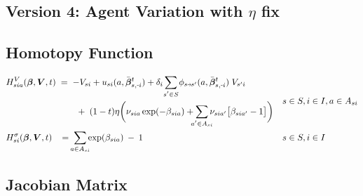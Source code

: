 \documentclass[11pt,fleqn]{article}
\newcommand{\bbeta}{\bm{\beta}}
\newcommand{\bV}{\bm{V}}
\newcommand{\shortminus}{{\text{\scalebox{0.4}[1.0]{\(-\)}}}}
\newcommand{\minusi}{\shortminus i}
\newcommand{\shortrightarrow}{\parbox{4pt}{\tikz{\draw[->](0,0)--(4pt,0);}}}
\newcommand{\phiss}{\phi_{s\shortrightarrow s'}}
\begin{document}
\subsection{Version 4: Agent Variation with $\eta$ fix}


\subsection*{Homotopy Function}

\begin{align*}
	& \begin{aligned}
		H^V_{sia}(\bbeta,\bV,t) & \;=\; - V_{si} + u_{si}(a,\bar{\bbeta}^t_{s,\minusi}) + \delta_i \sum\limits_{\mathclap{s'\in S}} \phiss(a,\bar{\bbeta}^t_{s,\minusi}) \; V_{s'i} \\
		& \qquad \;+\; (1-t)\eta \biggl( \nu_{sia} \exp(-\beta_{sia}) + \sum\limits_{\mathclap{a'\in A_{si}}} \nu_{sia'} \bigl[ \beta_{sia'} - 1 \bigr] \biggr)
	\end{aligned} && s\in S, i\in I, a\in A_{si} \\
	& H^\sigma_{si}(\bbeta,\bV,t) \;\; \;=\; \sum\limits_{\mathclap{a\in A_{si}}} \exp(\beta_{sia}) \:-\: 1 && s\in S, i\in I
\end{align*}


\subsection*{Jacobian Matrix}
\end{document}
